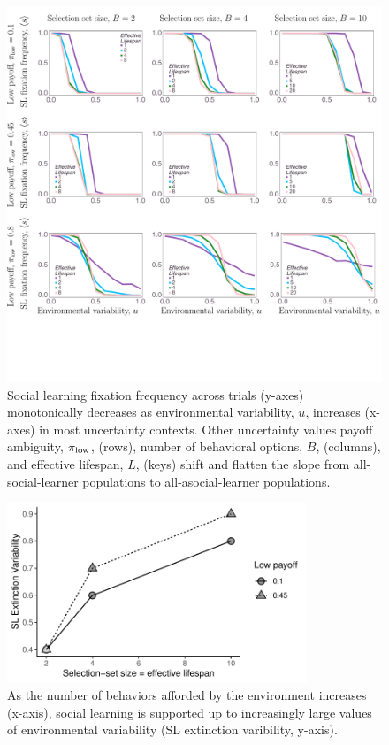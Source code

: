 \documentclass[letterpaper,11.5pt]{scrartcl}
\begin{document}
\begin{figure}
  \caption{Social learning fixation frequency across trials (y-axes) monotonically decreases as 
  environmental variability, $u$, increases (x-axes) in most uncertainty contexts. 
  Other uncertainty values payoff ambiguity, $\pi_{\mathrm{low}}$, (rows), number of behavioral options, $B$, (columns), and effective lifespan, $L$, (keys) shift and flatten the slope from all-social-learner populations to all-asocial-learner
  populations.}
  \label{fig:mainResults}
  \centering
    \includegraphics[width=\textwidth]{Figures/mainResultsPlots.pdf}
\end{figure}


\begin{figure}
  \caption{As the number of
  behaviors afforded by the environment increases (x-axis), 
  social learning is supported up to increasingly large values of environmental variability (SL extinction
    varibility, y-axis).}
  \label{fig:extinctionVariability}
  \centering
    \includegraphics[width=0.8\textwidth]{Figures/SL_Extinction_Variability.pdf}
\end{figure}
\end{document}
